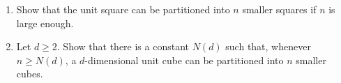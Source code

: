 \documentclass{article}
\begin{document}
\setlength{\parindent}{0pt}
\begin{enumerate}[label=\alph*)]
\item Show that the unit square can be partitioned into $n$ smaller squares if $n$ is large enough.
\item Let $d\ge2$. Show that there is a constant $N(d)$ such that, whenever $n\ge N(d)$, a $d$-dimensional unit cube can be partitioned into $n$ smaller cubes.
\end{enumerate}
\end{document}
